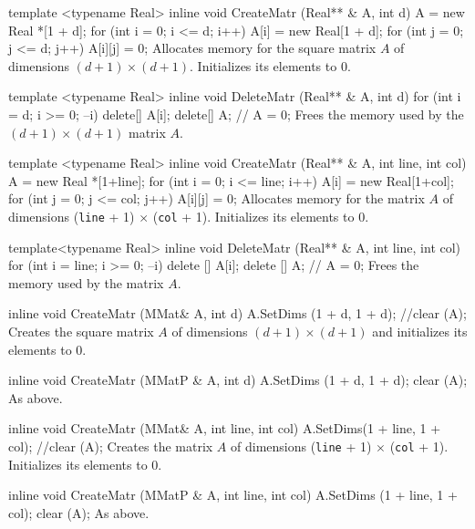 {%

\code

template <typename Real>
inline void CreateMatr (Real** & A, int d)\hide
{
    A = new Real *[1 + d];
    for (int i = 0; i <= d; i++) {
        A[i] = new Real[1 + d];
        for (int j = 0; j <= d; j++)
            A[i][j] = 0; }
}
\endhide
\endcode
\tab
Allocates memory for the square matrix $A$ of dimensions
   $(d+1)\times(d+1)$. Initializes its elements to 0.
\endtab
\code


template <typename Real>
inline void DeleteMatr (Real** & A, int d)\hide
{
    for (int i = d; i >= 0; --i)
        delete[] A[i];
    delete[] A;
 //   A = 0;
}
\endhide
\endcode
\tab
Frees the memory used by the  $(d+1)\times(d+1)$ matrix $A$.
\endtab
\code


template <typename Real>
inline void CreateMatr (Real** & A, int line, int col)\hide
{
    A = new Real *[1+line];
    for (int i = 0; i <= line; i++) {
        A[i] = new Real[1+col];
        for (int j = 0; j <= col; j++)
            A[i][j] = 0;
    }
}
\endhide
\endcode
\tab
Allocates memory for the matrix $A$ of dimensions
   (\texttt{line} + 1) $\times$ (\texttt{col} + 1). Initializes its elements to 0.
\endtab
\code


template<typename Real>
inline void DeleteMatr (Real** & A, int line, int col)\hide
{
    for (int i = line; i >= 0; --i)
        delete [] A[i];
    delete [] A;
//    A = 0;
}
\endhide
\endcode
\tab
Frees the memory used by the matrix $A$.
\endtab
\code


inline void CreateMatr (MMat& A, int d)\hide
{
    A.SetDims (1 + d, 1 + d);
    //clear (A);
}
\endhide
\endcode
\tab
Creates the square matrix $A$ of dimensions $(d+1)\times(d+1)$
   and initializes its elements to 0.
\endtab
\code


inline void CreateMatr (MMatP & A, int d)\hide
{
    A.SetDims (1 + d, 1 + d);   clear (A);
}
\endhide
\endcode
\tab
As above.
\endtab
\code


inline void CreateMatr (MMat& A, int line, int col)\hide
{
    A.SetDims(1 + line, 1 + col);
    //clear (A);
}
\endhide
\endcode
\tab
Creates the matrix $A$ of dimensions
   (\texttt{line} + 1) $\times$ (\texttt{col} + 1). Initializes its elements to 0.
\endtab
\code


inline void CreateMatr (MMatP & A, int line, int col)\hide
{
    A.SetDims (1 + line, 1 + col);   clear (A);
}
\endhide
\endcode
\tab
As above.
\endtab
\code


}
